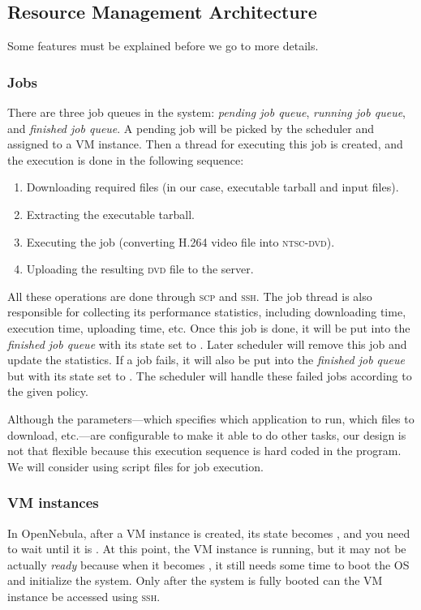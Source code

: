 \subsection{Resource Management Architecture}
Some features must be explained before we go to more details.

\subsubsection{Jobs}
There are three job queues in the system: \emph{pending job queue},
\emph{running job queue}, and \emph{finished job queue}. A pending job
will be picked by the scheduler and assigned to a VM instance. Then a
thread for executing this job is created, and the execution is done in
the following sequence:

\begin{enumerate}
\item Downloading required files (in our case, executable tarball and
  input files).
\item Extracting the executable tarball.
\item Executing the job (converting H.264 video file into
  \textsc{ntsc-dvd}).
\item Uploading the resulting \textsc{dvd} file to the server.
\end{enumerate}

All these operations are done through \textsc{scp} and \textsc{ssh}.
The job thread is also responsible for collecting its performance
statistics, including downloading time, execution time, uploading time,
etc. Once this job is done, it will be put into the
\emph{finished job queue} with its state set to
\statefinished. Later scheduler will remove this job and update the
statistics. If a job fails, it will also be put into the
\emph{finished job queue} but with its state set to \statefailed.
The scheduler will handle these failed jobs according to the given policy.

Although the parameters---which specifies which application to run, which
files to download, etc.---are configurable to make it able to do other
tasks, our design is not that flexible because this execution sequence
is hard coded in the program. We will consider using script files for job
execution.


\subsubsection{VM instances}
In OpenNebula, after a VM instance is created, its state becomes
\statepending, and you need to wait until it is \staterunning.
At this point, the VM instance is running, but it may not be actually
\emph{ready} because when it becomes \staterunning, it still needs some
time to boot the OS and initialize the system. Only after the system is
fully booted can the VM instance be accessed using \textsc{ssh}.

